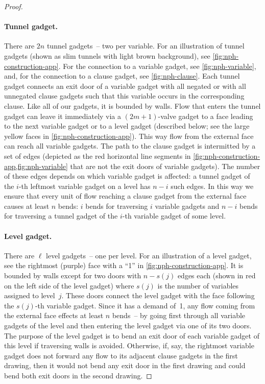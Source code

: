\documentclass[runningheads]{llncs}
\begin{document}
\begin{proof}
    \paragraph{Tunnel gadget.}
    There are $2n$ tunnel gadgets~-- two per variable.
    For an illustration of tunnel gadgets
    (shown as slim tunnels with light brown background),
    see \cref{fig:nph-construction-app}.
    For the connection to a variable gadget, see
    \cref{fig:nph-variable},
    and, for the connection to a clause gadget, see
    \cref{fig:nph-clause}.
    Each tunnel gadget connects an exit door of a variable gadget
    with all negated or with all unnegated clause gadgets
    such that this variable occurs in the corresponding clause.
    Like all of our gadgets, it is bounded by walls.
    Flow that enters the tunnel gadget can leave it immediately
    via a $(2m+1)$-valve gadget
    to a face leading to the next variable gadget or to a level gadget
    (described below; see the large yellow faces
    in \cref{fig:nph-construction-app}).
    This way flow from the external face can reach all variable gadgets.
    The path to the clause gadget is intermitted
    by a set of edges (depicted as the red horizontal line segments
    in \cref{fig:nph-construction-app,fig:nph-variable}
    that are not the exit doors of variable gadgets).
    The number of these edges depends on which variable gadget is affected:
    a tunnel gadget of the $i$-th leftmost variable gadget
    on a level has $n-i$ such edges.
    In this way we ensure that every unit of flow reaching a clause gadget
    from the external face causes at least $n$ bends:
    $i$ bends for traversing $i$ variable gadgets and
    $n - i$ bends for traversing a tunnel gadget of
    the $i$-th variable gadget of some level.
    
    
    \paragraph{Level gadget.}
    There are $\ell$ level gadgets~-- one per level.
    For an illustration of a level gadget,
    see the rightmost (purple) face
    with a ``1'' in \cref{fig:nph-construction-app}.
    It is bounded by walls except for
    two doors with $n - s(j)$ edges each
    (shown in red on the left side of the level gadget)
    where $s(j)$ is the number of variables assigned to level~$j$.
    These doors connect the level gadget with the face
    following the $s(j)$-th variable gadget.
    Since it has a demand of~1,
    any flow coming from the external face effects
    at least $n$ bends~-- by going first through
    all variable gadgets of the level and
    then entering the level gadget via one of its two doors.
    The purpose of the level gadget is to
    bend an exit door of each variable gadget of this level
    if traversing walls is avoided.
    Otherwise, if, say, the rightmost variable gadget does
    not forward any flow to its adjacent clause gadgets
    in the first drawing, then it would not bend any
    exit door in the first drawing and could bend both
    exit doors in the second drawing.
    

\end{proof}
\end{document}
